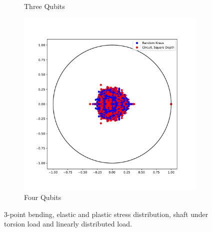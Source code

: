 \documentclass{article}
\begin{document}
\begin{figure}[htbp]
\begin{subfigure}[t]{0.3\textwidth}
\caption{Three Qubits}
\label{fig:figure14_8}
\end{subfigure}\hfill
\begin{subfigure}[t]{0.3\textwidth}
    \includegraphics[width=\linewidth]{../figures/twoQubit_squareDepth}
\caption{Four Qubits}
\label{fig:figure14_9}
\end{subfigure}

\caption{3-point bending, elastic and plastic stress distribution, 
    shaft under torsion load and linearly distributed load.}
\label{figure14_99}
\end{figure}





\end{document}
